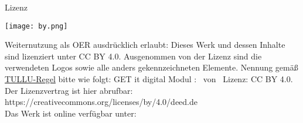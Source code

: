 
\begin{frame}
	\titlepage
\end{frame}

\begin{frame}{Lizenz}
	\begin{center}\texttt{[image: by.png]}\end{center}
	Weiternutzung als OER ausdrücklich erlaubt: Dieses Werk und dessen Inhalte sind lizenziert unter CC BY 4.0. Ausgenommen von der Lizenz
	sind die verwendeten Logos sowie alle anders gekennzeichneten Elemente. Nennung gemäß \href{https://open-educational-resources.de/oer-tullu-regel/}{TULLU-Regel} bitte wie folgt: \glqq GET it digital Modul \GetItDigitalModulnumber: \GetItDigitalModulname\grqq\ von \GetItDigitalAutorenListe \ Lizenz: CC BY 4.0.\\[2ex]
	Der Lizenzvertrag ist hier abrufbar:\\
	https://creativecommons.org/licenses/by/4.0/deed.de\\
	Das Werk ist online verfügbar unter:\\
	\GetItDigitalLink
\end{frame}
